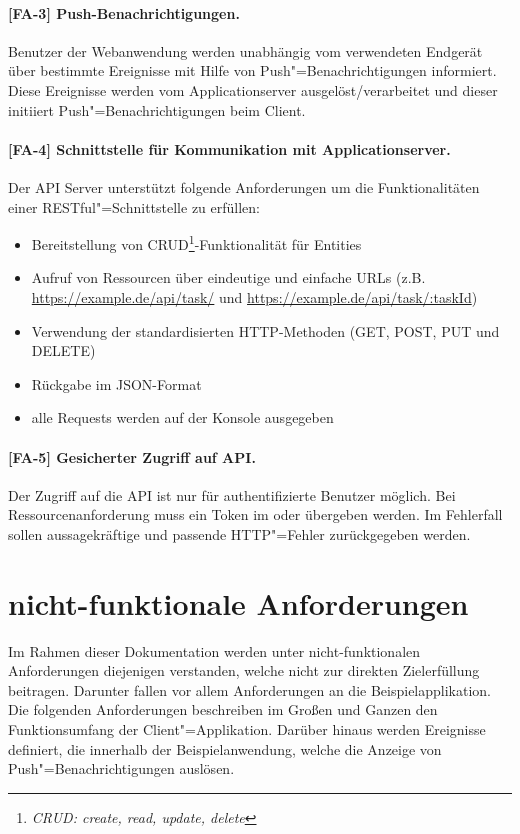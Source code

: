 \paragraph{[FA-3] Push-Benachrichtigungen.} Benutzer der Webanwendung werden unabhängig vom verwendeten Endgerät über bestimmte Ereignisse mit Hilfe von Push"=Benachrichtigungen informiert. Diese Ereignisse werden vom Applicationserver ausgelöst/verarbeitet und dieser initiiert Push"=Benachrichtigungen beim Client. 

\paragraph{[FA-4] Schnittstelle für Kommunikation mit Applicationserver.} Der API Server unterstützt folgende Anforderungen um die Funktionalitäten einer RESTful"=Schnittstelle zu erfüllen:

\begin{itemize}
\setlength{\itemsep}{0pt}%
\setlength{\parskip}{0pt}%
\item Bereitstellung von CRUD\footnote{\textit{CRUD: create, read, update, delete}}-Funktionalität für Entities
\item Aufruf von Ressourcen über eindeutige und einfache URLs (z.B. \url{https://example.de/api/task/} und \url{https://example.de/api/task/:taskId}) 
\item Verwendung der standardisierten HTTP-Methoden (GET, POST, PUT und DELETE) 
\item Rückgabe im JSON-Format
\item alle Requests werden auf der Konsole ausgegeben
\end{itemize}  

\paragraph{[FA-5] Gesicherter Zugriff auf API.} Der Zugriff auf die API ist nur für authentifizierte Benutzer möglich. Bei Ressourcenanforderung muss ein Token im  oder  übergeben werden. Im Fehlerfall sollen aussagekräftige und passende HTTP"=Fehler zurückgegeben werden.

\section{nicht-funktionale Anforderungen}
\label{sec_anforderungen_nicht-funktionale-anforderungen}

Im Rahmen dieser Dokumentation werden unter nicht-funktionalen Anforderungen diejenigen verstanden, welche nicht zur direkten Zielerfüllung beitragen. Darunter fallen vor allem Anforderungen an die Beispielapplikation. Die folgenden Anforderungen beschreiben im Großen und Ganzen den Funktionsumfang der Client"=Applikation. Darüber hinaus werden Ereignisse definiert, die innerhalb der Beispielanwendung, welche die Anzeige von Push"=Benachrichtigungen auslösen.

